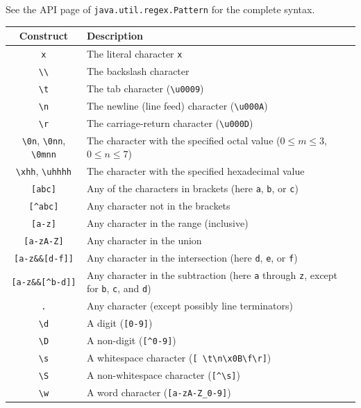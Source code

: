 \documentclass[a4paper,12pt]{article}
\begin{document}
See the API page of \lstinline/java.util.regex.Pattern/ for the complete syntax.\\

\noindent \begin{tabular*}{\textwidth}{|c|l|}
\hline
Construct & Description \\
\hline
\lstinline/x/ & The literal character \lstinline/x/ \\
\lstinline/\\/ & The backslash character \\
\lstinline/\t/ & The tab character (\lstinline/\u0009/) \\
\lstinline/\n/ & The newline (line feed) character (\lstinline/\u000A/) \\
\lstinline/\r/ & The carriage-return character (\lstinline/\u000D/) \\
\lstinline/\0n/, \lstinline/\0nn/, \lstinline/\0mnn/ & The character with the specified octal value ($0 \le m \le 3$, $0 \le n \le 7$) \\
\lstinline/\xhh/, \lstinline/\uhhhh/ & The character with the specified hexadecimal value \\
\lstinline/[abc]/ & Any of the characters in brackets (here \lstinline/a/, \lstinline/b/, or \lstinline/c/)\\
\lstinline/[^abc]/ & Any character not in the brackets \\
\lstinline/[a-z]/ & Any character in the range (inclusive) \\
\lstinline/[a-zA-Z]/ & Any character in the union \\
\lstinline/[a-z&&[d-f]]/ & Any character in the intersection (here \lstinline/d/, \lstinline/e/, or \lstinline/f/) \\
\lstinline/[a-z&&[^b-d]]/ & Any character in the subtraction (here \lstinline/a/ through \lstinline/z/, except for \lstinline/b/, \lstinline/c/, and \lstinline/d/) \\
\lstinline/./ & Any character (except possibly line terminators\footnotemark) \\
\lstinline/\d/ & A digit (\lstinline/[0-9]/) \\
\lstinline/\D/ & A non-digit (\lstinline/[^0-9]/) \\
\lstinline/\s/ & A whitespace character (\lstinline/[ \t\n\x0B\f\r]/) \\
\lstinline/\S/ & A non-whitespace character (\lstinline/[^\s]/) \\
\lstinline/\w/ & A word character (\lstinline/[a-zA-Z_0-9]/) \\

\end{tabular*}
\end{document}
